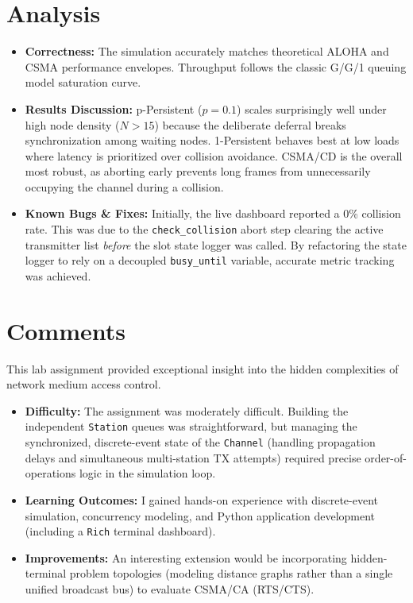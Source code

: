 \documentclass[a4paper,12pt]{article}
\begin{document}
\section{Analysis}

\begin{itemize}
    \item \textbf{Correctness:} The simulation accurately matches theoretical ALOHA and CSMA performance envelopes. Throughput follows the classic G/G/1 queuing model saturation curve.
    \item \textbf{Results Discussion:} p-Persistent ($p=0.1$) scales surprisingly well under high node density ($N > 15$) because the deliberate deferral breaks synchronization among waiting nodes. 1-Persistent behaves best at low loads where latency is prioritized over collision avoidance. CSMA/CD is the overall most robust, as aborting early prevents long frames from unnecessarily occupying the channel during a collision.
    \item \textbf{Known Bugs \& Fixes:} Initially, the live dashboard reported a 0\% collision rate. This was due to the \texttt{check\_collision} abort step clearing the active transmitter list \textit{before} the slot state logger was called. By refactoring the state logger to rely on a decoupled \texttt{busy\_until} variable, accurate metric tracking was achieved.
\end{itemize}

\section{Comments}

This lab assignment provided exceptional insight into the hidden complexities of network medium access control. 
\begin{itemize}
    \item \textbf{Difficulty:} The assignment was moderately difficult. Building the independent \texttt{Station} queues was straightforward, but managing the synchronized, discrete-event state of the \texttt{Channel} (handling propagation delays and simultaneous multi-station TX attempts) required precise order-of-operations logic in the simulation loop.
    \item \textbf{Learning Outcomes:} I gained hands-on experience with discrete-event simulation, concurrency modeling, and Python application development (including a \texttt{Rich} terminal dashboard).
    \item \textbf{Improvements:} An interesting extension would be incorporating hidden-terminal problem topologies (modeling distance graphs rather than a single unified broadcast bus) to evaluate CSMA/CA (RTS/CTS).
\end{itemize}
\end{document}
